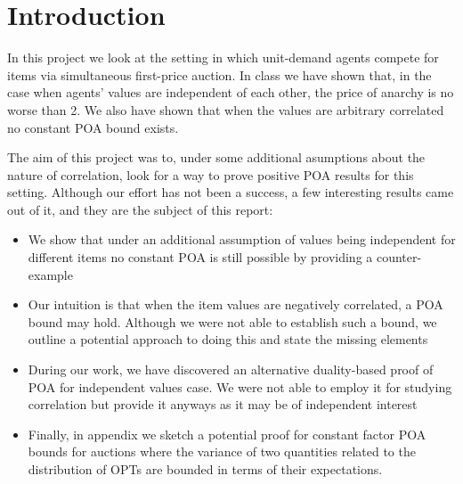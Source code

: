 \section{Introduction}

In this project we look at the setting in which unit-demand agents compete for items  via simultaneous first-price auction. In class we have shown that, in the case when agents' values are independent of each other, the price of anarchy is no worse than 2. We also have shown that when the values are arbitrary correlated no constant POA bound exists.

The aim of this project was to, under some additional asumptions about the nature of correlation, look for a way to prove positive POA results for this setting. Although our effort has not been a success, a few interesting results came out of it, and they are the subject of this report:

\begin{itemize}
\item We show that under an additional assumption of values being independent for different items no constant POA is still possible by providing a counter-example
\item Our intuition is that when the item values are negatively correlated, a POA bound may hold. Although we were not able to establish such a bound, we outline a potential approach to doing this and state the missing elements
\item During our work, we have discovered an alternative duality-based proof of POA for independent values case. We were not able to employ it for studying correlation but provide it anyways as it may be of independent interest
\item Finally, in appendix we sketch a potential proof for constant factor POA bounds for auctions where the variance of two quantities related to the distribution of OPTs are bounded in terms of their expectations.
\end{itemize}




